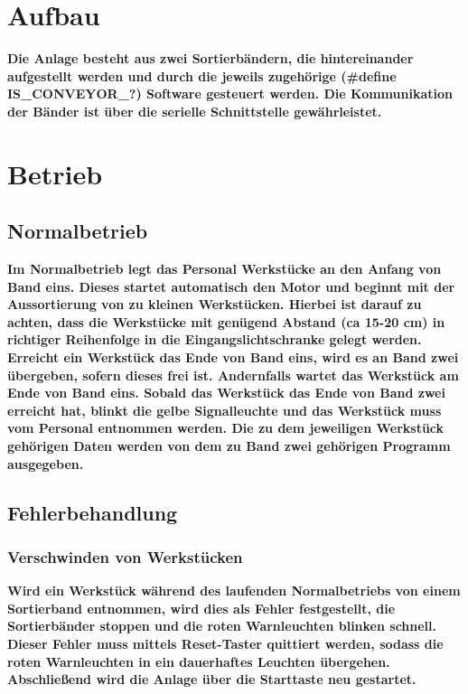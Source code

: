 \documentclass[oneside,a4paper,titlepage]{scrartcl} %
\begin{document}
\section{Aufbau}
\textbf{Die Anlage besteht aus zwei Sortierbändern, die hintereinander aufgestellt werden und durch die jeweils zugehörige (\#define IS\_CONVEYOR\_?) Software gesteuert werden. Die Kommunikation der Bänder ist über die serielle Schnittstelle gewährleistet. }
\newpage

\section{Betrieb}
\subsection{Normalbetrieb}
\textbf{Im Normalbetrieb legt das Personal Werkstücke an den Anfang von Band eins. Dieses startet automatisch den Motor und beginnt mit der Aussortierung von zu kleinen Werkstücken. Hierbei ist darauf zu achten, dass die Werkstücke mit genügend Abstand (ca 15-20 cm) in richtiger Reihenfolge in die Eingangslichtschranke gelegt werden. \newline
Erreicht ein Werkstück das Ende von Band eins, wird es an Band zwei übergeben, sofern dieses frei ist. Andernfalls wartet das Werkstück am Ende von Band eins. \newline
Sobald das Werkstück das Ende von Band zwei erreicht hat, blinkt die gelbe Signalleuchte und das Werkstück muss vom Personal entnommen werden.\newline
Die zu dem jeweiligen Werkstück gehörigen Daten werden von dem zu Band zwei gehörigen Programm ausgegeben.}

\subsection{Fehlerbehandlung}
\subsubsection{Verschwinden von Werkstücken}
\textbf{Wird ein Werkstück während des laufenden Normalbetriebs von einem Sortierband entnommen, wird dies als Fehler festgestellt, die Sortierbänder stoppen und die roten Warnleuchten blinken schnell. Dieser Fehler muss mittels Reset-Taster quittiert werden, sodass die roten Warnleuchten in ein dauerhaftes Leuchten übergehen. Abschließend wird die Anlage über die Starttaste neu gestartet. }
\end{document}
